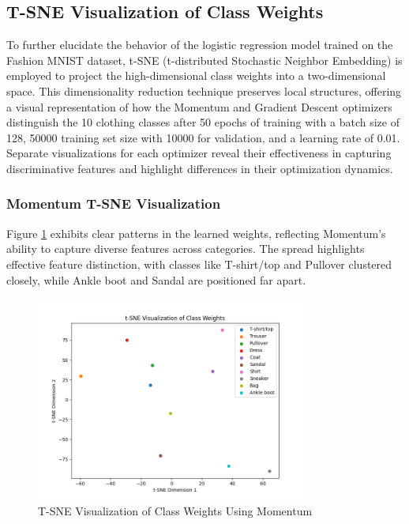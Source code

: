 \documentclass{article}
\begin{document}
\subsection{T-SNE Visualization of Class Weights}

To further elucidate the behavior of the logistic regression model trained on the Fashion MNIST dataset, t-SNE (t-distributed Stochastic Neighbor Embedding) is employed to project the high-dimensional class weights into a two-dimensional space. This dimensionality reduction technique preserves local structures, offering a visual representation of how the Momentum and Gradient Descent optimizers distinguish the 10 clothing classes after 50 epochs of training with a batch size of 128, 50000 training set size with 10000 for validation, and a learning rate of 0.01. Separate visualizations for each optimizer reveal their effectiveness in capturing discriminative features and highlight differences in their optimization dynamics.

\subsubsection{Momentum T-SNE Visualization}

Figure \ref{fig:momentum_tsne} exhibits clear patterns in the learned weights, reflecting Momentum’s ability to capture diverse features across categories. The spread highlights effective feature distinction, with classes like T-shirt/top and Pullover clustered closely, while Ankle boot and Sandal are positioned far apart.

\begin{figure}[H]
    \centering
    \includegraphics[width=0.8\textwidth]{assets/q2/momentum/tsne_100_epochs.png}
    \caption{T-SNE Visualization of Class Weights Using Momentum}
    \label{fig:momentum_tsne}
\end{figure}
\end{document}
